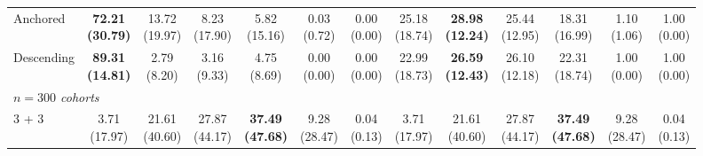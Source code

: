 {\begin{tabular}{l|cccccc|cccccc}
Anchored & {\cellcolor[HTML]{C8E6C9}} \bfseries \makecell{72.21 \\ (30.79)} & \makecell{13.72 \\ (19.97)} & \makecell{8.23 \\ (17.90)} & \makecell{5.82 \\ (15.16)} & \makecell{0.03 \\ (0.72)} & \makecell{0.00 \\ (0.00)} & {\cellcolor[HTML]{C8E6C9}} \makecell{25.18 \\ (18.74)} & \bfseries \makecell{28.98 \\ (12.24)} & \makecell{25.44 \\ (12.95)} & \makecell{18.31 \\ (16.99)} & \makecell{1.10 \\ (1.06)} & \makecell{1.00 \\ (0.00)} \\
Descending & {\cellcolor[HTML]{C8E6C9}} \bfseries \makecell{89.31 \\ (14.81)} & \makecell{2.79 \\ (8.20)} & \makecell{3.16 \\ (9.33)} & \makecell{4.75 \\ (8.69)} & \makecell{0.00 \\ (0.00)} & \makecell{0.00 \\ (0.00)} & {\cellcolor[HTML]{C8E6C9}} \makecell{22.99 \\ (18.73)} & \bfseries \makecell{26.59 \\ (12.43)} & \makecell{26.10 \\ (12.18)} & \makecell{22.31 \\ (18.74)} & \makecell{1.00 \\ (0.00)} & \makecell{1.00 \\ (0.00)} \\
\midrule
\multicolumn{13}{l}{\emph{$n = 300$ cohorts}} \\
3 + 3 & {\cellcolor[HTML]{C8E6C9}} \makecell{3.71 \\ (17.97)} & \makecell{21.61 \\ (40.60)} & \makecell{27.87 \\ (44.17)} & \bfseries \makecell{37.49 \\ (47.68)} & \makecell{9.28 \\ (28.47)} & \makecell{0.04 \\ (0.13)} & {\cellcolor[HTML]{C8E6C9}} \makecell{3.71 \\ (17.97)} & \makecell{21.61 \\ (40.60)} & \makecell{27.87 \\ (44.17)} & \bfseries \makecell{37.49 \\ (47.68)} & \makecell{9.28 \\ (28.47)} & \makecell{0.04 \\ (0.13)} \\

\end{tabular}}
